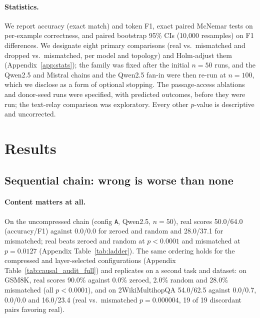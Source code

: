 \documentclass[11pt]{article}
\begin{document}
\paragraph{Statistics.} We report accuracy (exact match) and token F1,
exact paired McNemar tests on per-example correctness, and paired
bootstrap 95\% CIs (10{,}000 resamples) on F1 differences. We designate
eight primary comparisons (real vs.\ mismatched and dropped vs.\
mismatched, per model and topology) and Holm-adjust them
(Appendix~\ref{app:stats}); the family was fixed after the initial
$n{=}50$ runs, and the Qwen2.5 and Mistral chains and the Qwen2.5 fan-in were
then re-run at $n{=}100$, which we disclose as a form of optional stopping. The
passage-access ablations and donor-seed runs were specified, with predicted
outcomes, before they were run; the text-relay comparison was exploratory. Every
other $p$-value is descriptive and uncorrected.

\section{Results}
\label{sec:results}

\subsection{Sequential chain: wrong is worse than none}

\paragraph{Content matters at all.} On the uncompressed chain
(config \texttt{A}, Qwen2.5, $n{=}50$), real scores 50.0/64.0
(accuracy/F1) against 0.0/0.0 for zeroed and random and 28.0/37.1 for
mismatched; real beats zeroed and random at $p<0.0001$ and mismatched at
$p=0.0127$ (Appendix Table~\ref{tab:ladder}). The same ordering holds for the
compressed and layer-selected configurations (Appendix
Table~\ref{tab:causal_audit_full}) and replicates on a second task and
dataset: on GSM8K, real scores 90.0\% against 0.0\% zeroed, 2.0\% random and
28.0\% mismatched (all $p<0.0001$), and on 2WikiMultihopQA 54.0/62.5 against
0.0/0.7, 0.0/0.0 and 16.0/23.4 (real vs.\ mismatched $p=0.000004$, 19 of 19
discordant pairs favoring real).
\end{document}
